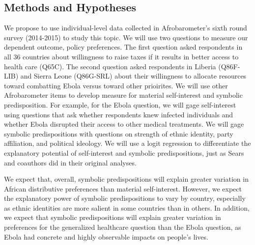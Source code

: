 \documentclass[]{article}
\begin{document}
\subsection{Methods and Hypotheses}\label{methods-and-hypotheses}

We propose to use individual-level data collected in Afrobarometer's
sixth round survey (2014-2015) to study this topic. We will use two
questions to measure our dependent outcome, policy preferences. The
first question asked respondents in all 36 countries about willingness
to raise taxes if it results in better access to health care (Q65C). The
second question asked respondents in Liberia (Q86F-LIB) and Sierra Leone
(Q86G-SRL) about their willingness to allocate resources toward
combatting Ebola versus toward other prioirites. We will use other
Afrobarometer items to develop measure for material self-interest and
symbolic predisposition. For example, for the Ebola question, we will
gage self-interest using questions that ask whether respondents knew
infected individuals and whether Ebola disrupted their access to other
medical treatments. We will gage symbolic predispositions with questions
on strength of ethnic identity, party affiliation, and political
ideology. We will use a logit regression to differentiate the
explanatory potential of self-interest and symbolic predispositions,
just as Sears and coauthors did in their original analyses.

We expect that, overall, symbolic predispositions will explain greater
variation in African distributive preferences than material
self-interest. However, we expect the explanatory power of symbolic
predispositions to vary by country, especially as ethnic identities are
more salient in some countries than in others. In addition, we expect
that symbolic predispositions will explain greater variation in
preferences for the generalized healthcare question than the Ebola
question, as Ebola had concrete and highly observable impacts on
people's lives.
\end{document}
